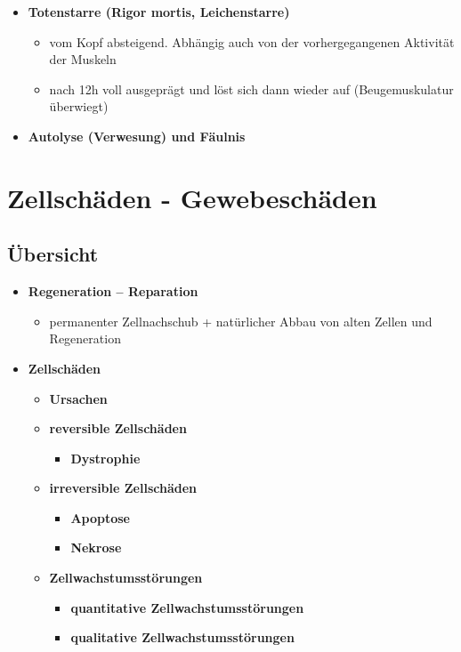 \begin{itemize}
\begin{itemize}
\begin{itemize}
					\end{itemize}
				\item \textbf{Totenstarre (Rigor mortis, Leichenstarre)}
					\begin{itemize}
						\item vom Kopf absteigend. Abhängig auch von der vorhergegangenen Aktivität der Muskeln
						\item nach 12h voll ausgeprägt und löst sich dann wieder auf (Beugemuskulatur überwiegt)
					\end{itemize}
				\item \textbf{Autolyse (Verwesung) und Fäulnis}
			\end{itemize}
	\end{itemize}

\section{Zellschäden - Gewebeschäden}

\subsection{Übersicht}
	\begin{itemize}
		\item \textbf{Regeneration – Reparation}
			\begin{itemize}
				\item permanenter Zellnachschub + natürlicher Abbau von alten Zellen und Regeneration
			\end{itemize}
		\item \textbf{Zellschäden}
			\begin{itemize}
				\item \textbf{Ursachen}
				\item \textbf{reversible Zellschäden}
					\begin{itemize}
						\item \textbf{Dystrophie}
					\end{itemize}
				\item \textbf{irreversible Zellschäden}
					\begin{itemize}
						\item \textbf{Apoptose}
						\item \textbf{Nekrose}
					\end{itemize}
				\item \textbf{Zellwachstumsstörungen}
					\begin{itemize}
						\item \textbf{quantitative Zellwachstumsstörungen}
						\item \textbf{qualitative Zellwachstumsstörungen}
					\end{itemize}
			\end{itemize}
	\end{itemize}

